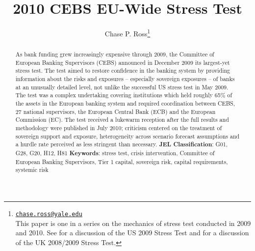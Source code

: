 \documentclass[12pt]{article}
\begin{document}
\lhead{ }

\renewcommand{\headrulewidth}{0.0pt}
\renewcommand{\footrulewidth}{0.0pt}


\title{2010 CEBS EU-Wide Stress Test}%
\author{Chase P. Ross\thanks{\texttt{\href{mailto:chase.ross@yale.edu}{chase.ross@yale.edu}} \\ This paper is one in a series on the mechanics of stress test conducted in 2009 and 2010. See \citet{Ross2016a} for a discussion of the US 2009 Stress Test and \citet{Ross2016b} for a discussion of the UK 2008/2009 Stress Test.}}



\maketitle

\begin{abstract}
As bank funding grew increasingly expensive through 2009, the Committee of European Banking Supervisors (CEBS) announced in December 2009 its largest-yet stress test. The test aimed to restore confidence in the banking system by providing information about the risks and exposures -- especially sovereign exposures -- of banks at an unusually detailed level, not unlike the successful US stress test in May 2009. The test was a complex undertaking covering institutions which held roughly 65\% of the assets in the European banking system and required coordination between CEBS, 27 national supervisors, the European Central Bank (ECB) and the European Commission (EC). The test received a lukewarm reception after the full results and methodology were published in July 2010; criticism centered on the treatment of sovereign support and exposure, heterogeneity across scenario forecast assumptions and a hurdle rate perceived as less stringent than necessary.
\newline
\newline
\textbf{JEL Classification}: G01, G28, G20, H12, H81
\newline
\textbf{Keywords}: stress test, crisis intervention, Committee of European Banking Supervisors, Tier 1 capital, sovereign risk, capital requirements, systemic risk

\end{abstract}
\newpage
\tableofcontents
\newpage
\end{document}
